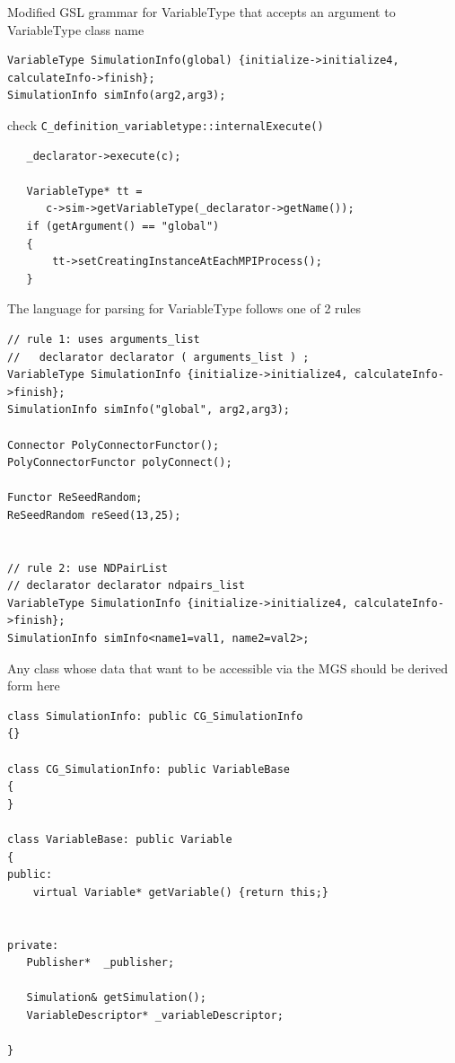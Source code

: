 \begin{mdframed}

Modified GSL grammar for VariableType that accepts an argument to VariableType
class name
\begin{verbatim}
VariableType SimulationInfo(global) {initialize->initialize4, calculateInfo->finish};
SimulationInfo simInfo(arg2,arg3);
\end{verbatim}
check \verb!C_definition_variabletype::internalExecute()!

\begin{verbatim}
   _declarator->execute(c);

   VariableType* tt = 
      c->sim->getVariableType(_declarator->getName());
   if (getArgument() == "global")
   {
	   tt->setCreatingInstanceAtEachMPIProcess();
   }
\end{verbatim}

\end{mdframed}

The language for parsing for VariableType follows one of 2 rules
\begin{verbatim}
// rule 1: uses arguments_list
//   declarator declarator ( arguments_list ) ;
VariableType SimulationInfo {initialize->initialize4, calculateInfo->finish};
SimulationInfo simInfo("global", arg2,arg3);

Connector PolyConnectorFunctor();
PolyConnectorFunctor polyConnect();

Functor ReSeedRandom;
ReSeedRandom reSeed(13,25);


// rule 2: use NDPairList
// declarator declarator ndpairs_list
VariableType SimulationInfo {initialize->initialize4, calculateInfo->finish};
SimulationInfo simInfo<name1=val1, name2=val2>;

\end{verbatim}

 Any class whose data that want to be accessible via the MGS should be
derived form here

\begin{verbatim}
class SimulationInfo: public CG_SimulationInfo
{}

class CG_SimulationInfo: public VariableBase 
{
}

class VariableBase: public Variable
{
public:
    virtual Variable* getVariable() {return this;}


private:
   Publisher*  _publisher;
   
   Simulation& getSimulation();
   VariableDescriptor* _variableDescriptor;

}
\end{verbatim}


